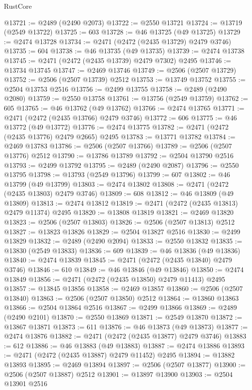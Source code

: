 \begin{lexlean}{RustCore}
\begin{coremodule}
@13721 := @2489 (@2490 @2073)
@13722 := @2550 @13721
@13724 := @13719 (@2549 @13722)
@13725 := 603
@13728 := @46 @13725 (@49 @13725)
@13729 := @2474 @13728
@13734 := @2471 (@2472 (@2435 @13729) @2479 @3746)
@13735 := 604
@13738 := @46 @13735 (@49 @13735)
@13739 := @2474 @13738
@13745 := @2471 (@2472 (@2435 @13739) @2479 @7302) @2495
@13746 := @13734 @13745
@13747 := @2469 @13746
@13749 := @2506 (@2507 @13729)
@13752 := @2506 (@2507 @13739) @2512
@13753 := @13749 @13752
@13755 := @2504 @13753 @2516
@13756 := @2499 @13755
@13758 := @2489 (@2490 @2080)
@13759 := @2550 @13758
@13761 := @13756 (@2549 @13759)
@13762 := 605
@13765 := @46 @13762 (@49 @13762)
@13766 := @2474 @13765
@13771 := @2471 (@2472 (@2435 @13766) @2479 @3746)
@13772 := 606
@13775 := @46 @13772 (@49 @13772)
@13776 := @2474 @13775
@13782 := @2471 (@2472 (@2435 @13776) @2479 @2665) @2495
@13783 := @13771 @13782
@13784 := @2469 @13783
@13786 := @2506 (@2507 @13766)
@13789 := @2506 (@2507 @13776) @2512
@13790 := @13786 @13789
@13792 := @2504 @13790 @2516
@13793 := @2499 @13792
@13795 := @2489 (@2490 @2087)
@13796 := @2550 @13795
@13798 := @13793 (@2549 @13796)
@13799 := 607
@13802 := @46 @13799 (@49 @13799)
@13803 := @2474 @13802
@13808 := @2471 (@2472 (@2435 @13803) @2479 @3746)
@13809 := 608
@13812 := @46 @13809 (@49 @13809)
@13813 := @2474 @13812
@13819 := @2471 (@2472 (@2435 @13813) @2479 @11374) @2495
@13820 := @13808 @13819
@13821 := @2469 @13820
@13823 := @2506 (@2507 @13803)
@13826 := @2506 (@2507 @13813) @2512
@13827 := @13823 @13826
@13829 := @2504 @13827 @2516
@13830 := @2499 @13829
@13832 := @2489 (@2490 @2094)
@13833 := @2550 @13832
@13835 := @13830 (@2549 @13833)
@13836 := 609
@13839 := @46 @13836 (@49 @13836)
@13840 := @2474 @13839
@13845 := @2471 (@2472 (@2435 @13840) @2479 @3746)
@13846 := 610
@13849 := @46 @13846 (@49 @13846)
@13850 := @2474 @13849
@13856 := @2471 (@2472 (@2435 @13850) @2479 @11413) @2495
@13857 := @13845 @13856
@13858 := @2469 @13857
@13860 := @2506 (@2507 @13840)
@13863 := @2506 (@2507 @13850) @2512
@13864 := @13860 @13863
@13866 := @2504 @13864 @2516
@13867 := @2499 @13866
@13869 := @2489 (@2490 @2101)
@13870 := @2550 @13869
@13871 := @2549 @13870
@13872 := @13867 @13871
@13873 := 611
@13876 := @46 @13873 (@49 @13873)
@13877 := @2474 @13876
@13882 := @2471 (@2472 (@2435 @13877) @2479 @3746)
@13883 := 612
@13886 := @46 @13883 (@49 @13883)
@13887 := @2474 @13886
@13893 := @2471 (@2472 (@2435 @13887) @2479 @11452) @2495
@13894 := @13882 @13893
@13895 := @2469 @13894
@13897 := @2506 (@2507 @13877)
@13900 := @2506 (@2507 @13887) @2512
@13901 := @13897 @13900
@13903 := @2504 @13901 @2516

\end{coremodule}
\end{lexlean}
